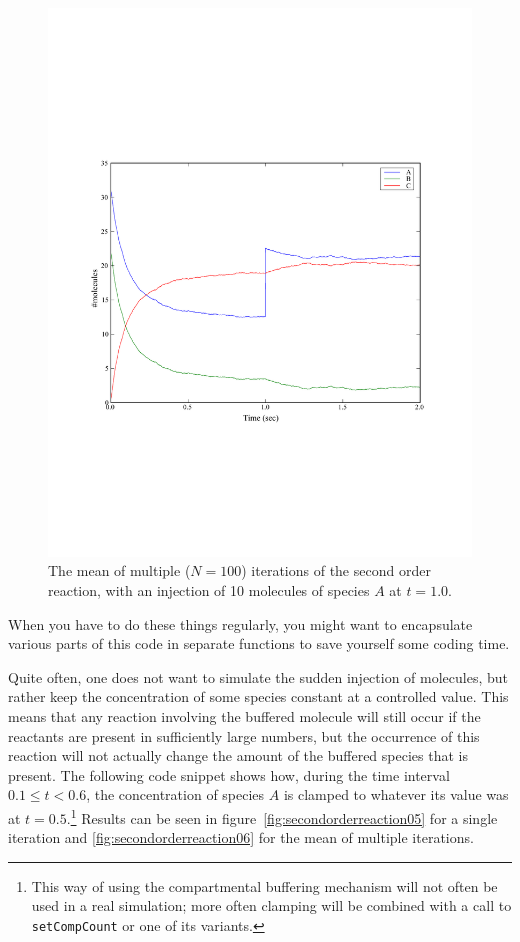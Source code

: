 \documentclass[a4paper,12pt]{book}
\begin{document}
\begin{figure}
\centering
\includegraphics[width=13cm]{secondorderreaction04.pdf}
\caption{The mean of multiple ($N=100$) iterations of the second order reaction, with an injection of 10 molecules of species $A$ at $t=1.0$.}
\label{fig:secondorderreaction04}
\end{figure}

When you have to do these things regularly, you might want to encapsulate various parts of this code in separate functions to save yourself some coding time. 

Quite often, one does not want to simulate the sudden injection of molecules, but rather keep the concentration of some species constant at a controlled value. This means that any reaction involving the buffered molecule will still occur if the reactants are present in sufficiently large numbers, but the occurrence of this reaction will not actually change the amount of the buffered species that is present. The following code snippet shows how, during the time interval $0.1 \leq t < 0.6$, the concentration of species $A$ is clamped to whatever its value was at $t = 0.5$.\footnote{This way of using the compartmental buffering mechanism will not often be used in a real simulation; more often clamping will be combined with a call to \texttt{setCompCount} or one of its variants.} Results can be seen in figure~\ref{fig:secondorderreaction05} for a single iteration and \ref{fig:secondorderreaction06} for the mean of multiple iterations.
\end{document}
